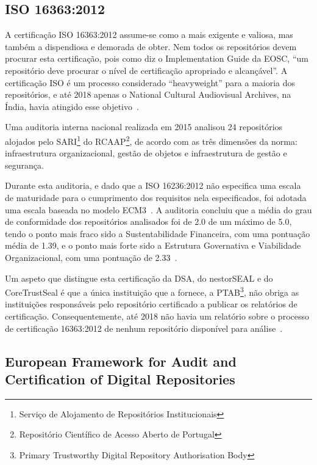 \documentclass[sigconf,nonacm]{acmart}
\begin{document}

\subsection{ISO 16363:2012} %
\label{sub:iso_16363_2012}

A certificação ISO 16363:2012 assume-se como a mais exigente e valiosa, mas também a dispendiosa e demorada de obter. Nem todos os repositórios devem procurar esta certificação, pois como diz o Implementation Guide da EOSC, ``um repositório deve procurar o nível de certificação apropriado e alcançável''\cite{hodson2018turning}. A certificação ISO é um processo considerado ``heavyweight'' para a maioria dos repositórios, e até 2018 apenas o National Cultural Audiovisual Archives, na Índia, havia atingido esse objetivo~\cite{Lindlar_Schwab_2019,IndianMinistryofCulture2017}.

Uma auditoria interna nacional realizada em 2015 analisou 24 repositórios alojados pelo SARI\footnote{Serviço de Alojamento de Repositórios Institucionais} do RCAAP\footnote{Repositório Científico de Acesso Aberto de Portugal}, de acordo com as três dimensões da norma: infraestrutura organizacional, gestão de objetos e infraestrutura de gestão e segurança.

Durante esta auditoria, e dado que a ISO 16236:2012 não especifica uma escala de maturidade para o cumprimento dos requisitos nela especificados, foi adotada uma escala baseada no modelo ECM3~\cite{Katuu2013}. A auditoria concluiu que a média do grau de conformidade dos repositórios analisados foi de 2.0 de um máximo de 5.0, tendo o ponto mais fraco sido a Sustentabilidade Financeira, com uma pontuação média de 1.39, e o ponto mais forte sido a Estrutura Governativa e Viabilidade Organizacional, com uma pontuação de 2.33~\cite{Carvalho2014}.

Um aspeto que distingue esta certificação da DSA, do nestorSEAL e do CoreTrustSeal é que a única instituição que a fornece, a PTAB\footnote{Primary Trustworthy Digital Repository Authorisation Body}, não obriga as instituições responsáveis pelo repositório certificado a publicar os relatórios de certificação. Consequentemente, até 2018 não havia um relatório sobre o processo de certificação 16363:2012 de nenhum repositório disponível para análise~\cite{Lindlar_Schwab_2019}.


\subsection{European Framework for Audit and Certification of Digital Repositories} %
\label{sub:european_framework_for_audit_and_certification_of_digital_repositories}
\end{document}

